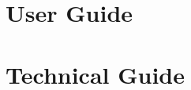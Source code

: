 \documentclass[a4paper,11pt]{book}
\begin{document}
\mainmatter
\pagestyle{fancy}

\part{User Guide}

% 
% 
% 


\part{Technical Guide}


% 
% 


\backmatter


\end{document}
